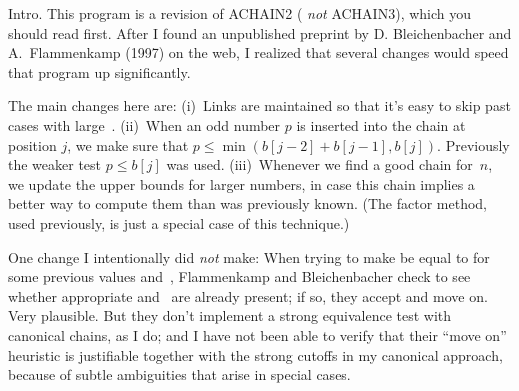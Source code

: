 
\srcloctrue
\datethis

Intro. This program is a revision of {\mc ACHAIN2} ({\it
not\/} {\mc
ACHAIN3}), which you should read first. After I found an unpublished preprint
by D. Bleichenbacher and A.~Flammenkamp (1997) on the web, I realized that
several changes would speed that program up significantly.

The main changes here are:
(i)~Links are maintained so that it's easy to skip past cases
with large~.
(ii)~When an odd number $p$ is inserted into the chain at position $j$,
we make sure that $p\le\min(b[j-2]+b[j-1],b[j])$. Previously the weaker test
$p\le b[j]$ was used.
(iii)~Whenever we find a good chain for~$n$, we update the upper bounds for
larger numbers, in case this chain implies a better way to compute them
than was previously known. (The factor method, used previously, is
just a special case of this technique.)

One change I intentionally did {\it not\/} make: When trying
to make  be equal to  for some previous values  and~,
Flammenkamp and Bleichenbacher check to see whether appropriate
 and~ are already present; if so, they accept  and
move on. Very plausible. But they don't implement a strong equivalence
test with canonical chains, as I do; and I have not been able to
verify that their ``move on'' heuristic is justifiable together with
the strong cutoffs in my canonical approach, because of subtle
ambiguities that arise in special cases.

